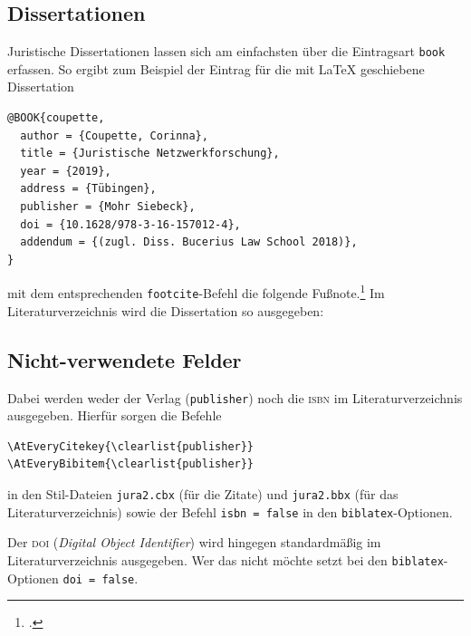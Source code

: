 \documentclass[headings=small,numbers=noenddot, 12pt,oneside]{scrartcl}
\begin{document}
\subsection{Dissertationen}
Juristische Dissertationen lassen sich am einfachsten über die Eintragsart \texttt{book} erfassen. So ergibt zum Beispiel der Eintrag für die mit \LaTeX{} geschiebene Dissertation
\begin{verbatim}
@BOOK{coupette,
  author = {Coupette, Corinna},
  title = {Juristische Netzwerkforschung},
  year = {2019},
  address = {Tübingen},
  publisher = {Mohr Siebeck},
  doi = {10.1628/978-3-16-157012-4},
  addendum = {(zugl. Diss. Bucerius Law School 2018)},
}
\end{verbatim}
mit dem entsprechenden \texttt{footcite}-Befehl die folgende Fußnote.\footcite[66]{coupette}
Im Literaturverzeichnis wird die Dissertation so ausgegeben: 
\printbibliography[type=book, title={Literaturverzeichnis (nur Dissertationen)},heading=subbibliography, keyword={book:diss}]

\subsection{Nicht-verwendete Felder}
Dabei werden weder der Verlag (\texttt{publisher}) noch die \textsc{isbn} im Literaturverzeichnis ausgegeben. Hierfür sorgen die Befehle
\begin{verbatim}
\AtEveryCitekey{\clearlist{publisher}}
\AtEveryBibitem{\clearlist{publisher}}
\end{verbatim}
in den Stil-Dateien \texttt{jura2.cbx} (für die Zitate) und  \texttt{jura2.bbx} (für das Literaturverzeichnis) sowie der Befehl \texttt{isbn = false} in den \texttt{biblatex}-Optionen.

Der \textsc{doi} (\textit{Digital Object Identifier}) wird hingegen standardmäßig im Literaturverzeichnis ausgegeben. Wer das nicht möchte setzt bei den \texttt{biblatex}-Optionen \texttt{doi = false}.
\end{document}

